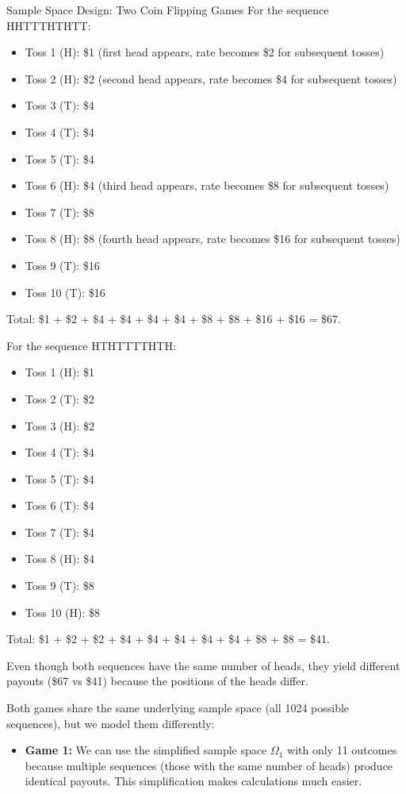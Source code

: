 \begin{itemize}
\begin{exampleboxbreak}{Sample Space Design: Two Coin Flipping Games}
For the sequence HHTTTHTHTT:
\begin{itemize}
    \item Toss 1 (H): \$1 (first head appears, rate becomes \$2 for subsequent tosses)
    \item Toss 2 (H): \$2 (second head appears, rate becomes \$4 for subsequent tosses)
    \item Toss 3 (T): \$4
    \item Toss 4 (T): \$4
    \item Toss 5 (T): \$4
    \item Toss 6 (H): \$4 (third head appears, rate becomes \$8 for subsequent tosses)
    \item Toss 7 (T): \$8
    \item Toss 8 (H): \$8 (fourth head appears, rate becomes \$16 for subsequent tosses)
    \item Toss 9 (T): \$16
    \item Toss 10 (T): \$16
\end{itemize}
Total: \$1 + \$2 + \$4 + \$4 + \$4 + \$4 + \$8 + \$8 + \$16 + \$16 = \$67.

For the sequence HTHTTTTHTH:
\begin{itemize}
    \item Toss 1 (H): \$1
    \item Toss 2 (T): \$2
    \item Toss 3 (H): \$2
    \item Toss 4 (T): \$4
    \item Toss 5 (T): \$4
    \item Toss 6 (T): \$4
    \item Toss 7 (T): \$4
    \item Toss 8 (H): \$4
    \item Toss 9 (T): \$8
    \item Toss 10 (H): \$8
\end{itemize}
Total: \$1 + \$2 + \$2 + \$4 + \$4 + \$4 + \$4 + \$4 + \$8 + \$8 = \$41.

Even though both sequences have the same number of heads, they yield different payouts (\$67 vs \$41) because the positions of the heads differ.


Both games share the same underlying sample space (all 1024 possible sequences), but we model them differently:
\begin{itemize}
    \item \textbf{Game 1:} We can use the simplified sample space $\Omega_1$ with only 11 outcomes because multiple sequences (those with the same number of heads) produce identical payouts. This simplification makes calculations much easier.


\end{itemize}
\end{exampleboxbreak}
\end{itemize}
